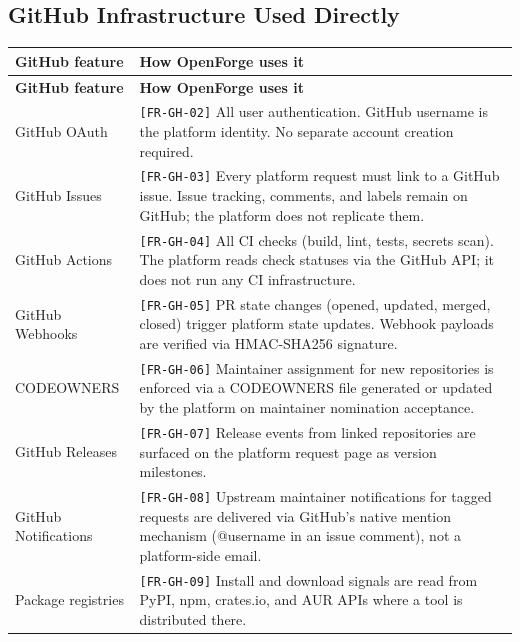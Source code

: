 \documentclass[12pt,a4paper]{article}
\begin{document}
\subsection{GitHub Infrastructure Used Directly}
\begin{longtable}{L{3.5cm} L{9.8cm}}
  \color{white}\bfseries GitHub feature & \color{white}\bfseries How OpenForge uses it \\
  \endfirsthead
  \color{white}\bfseries GitHub feature & \color{white}\bfseries How OpenForge uses it \\
  \endhead\hline
  GitHub OAuth     & \texttt{[FR-GH-02]} All user authentication. GitHub username is the platform identity. No separate account creation required. \\
  GitHub Issues    & \texttt{[FR-GH-03]} Every platform request must link to a GitHub issue. Issue tracking, comments, and labels remain on GitHub; the platform does not replicate them. \\
  GitHub Actions   & \texttt{[FR-GH-04]} All CI checks (build, lint, tests, secrets scan). The platform reads check statuses via the GitHub API; it does not run any CI infrastructure. \\
  GitHub Webhooks  & \texttt{[FR-GH-05]} PR state changes (opened, updated, merged, closed) trigger platform state updates. Webhook payloads are verified via HMAC-SHA256 signature. \\
  CODEOWNERS       & \texttt{[FR-GH-06]} Maintainer assignment for new repositories is enforced via a CODEOWNERS file generated or updated by the platform on maintainer nomination acceptance. \\
  GitHub Releases  & \texttt{[FR-GH-07]} Release events from linked repositories are surfaced on the platform request page as version milestones. \\
  GitHub Notifications & \texttt{[FR-GH-08]} Upstream maintainer notifications for tagged requests are delivered via GitHub's native mention mechanism (@username in an issue comment), not a platform-side email. \\
  Package registries & \texttt{[FR-GH-09]} Install and download signals are read from PyPI, npm, crates.io, and AUR APIs where a tool is distributed there. \\
  \hline
\end{longtable}
\end{document}
